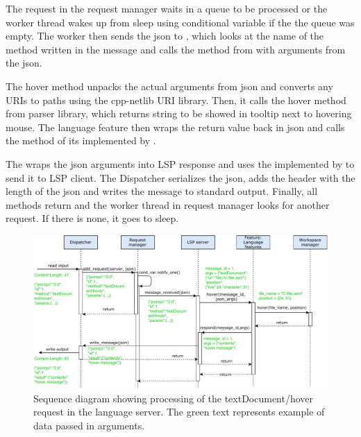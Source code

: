 The request in the request manager waits in a queue to be processed or the worker thread wakes up from sleep using conditional variable if the the queue was empty. The worker then sends the json to , which looks at the name of the method written in the message and calls the method  from  with arguments from the json.

The hover method unpacks the actual arguments from json and converts any URIs to paths using the cpp-netlib URI library. Then, it calls the hover method from parser library, which returns string to be showed in tooltip next to hovering mouse. The language feature then wraps the return value back in json and calls the  method of its  implemented by .

The  wraps the json arguments into LSP response and uses the  implemented by  to send it to LSP client. The Dispatcher serializes the json, adds the header with the length of the json and writes the message to standard output. Finally, all methods return and the worker thread in request manager looks for another request. If there is none, it goes to sleep.

\begin{landscape}
	\begin{figure}
		\centering
		\includegraphics[width=21cm]{img/hover_sequence}
		\caption{Sequence diagram showing processing of the textDocument/hover request in the language server. The green text represents example of data passed in arguments.}
		\label{hover_sequence}
	\end{figure}
\end{landscape}


